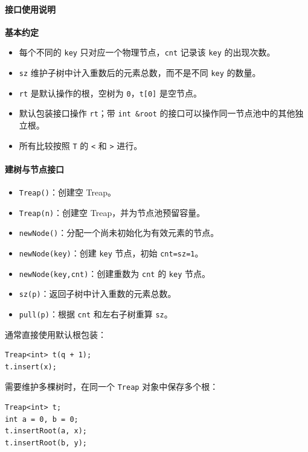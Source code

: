 \paragraph*{接口使用说明}

\textbf{基本约定}

\begin{itemize}
  \item 每个不同的 \texttt{key} 只对应一个物理节点，\texttt{cnt} 记录该 \texttt{key} 的出现次数。
  \item \texttt{sz} 维护子树中计入重数后的元素总数，而不是不同 \texttt{key} 的数量。
  \item \texttt{rt} 是默认操作的根，空树为 \texttt{0}，\texttt{t[0]} 是空节点。
  \item 默认包装接口操作 \texttt{rt}；带 \texttt{int \&root} 的接口可以操作同一节点池中的其他独立根。
  \item 所有比较按照 \texttt{T} 的 \texttt{<} 和 \texttt{>} 进行。
\end{itemize}

\paragraph*{建树与节点接口}

\begin{itemize}
  \item \texttt{Treap()}：创建空 Treap。
  \item \texttt{Treap(n)}：创建空 Treap，并为节点池预留容量。
  \item \texttt{newNode()}：分配一个尚未初始化为有效元素的节点。
  \item \texttt{newNode(key)}：创建 \texttt{key} 节点，初始 \texttt{cnt=sz=1}。
  \item \texttt{newNode(key,cnt)}：创建重数为 \texttt{cnt} 的 \texttt{key} 节点。
  \item \texttt{sz(p)}：返回子树中计入重数的元素总数。
  \item \texttt{pull(p)}：根据 \texttt{cnt} 和左右子树重算 \texttt{sz}。
\end{itemize}

通常直接使用默认根包装：

\begin{verbatim}
Treap<int> t(q + 1);
t.insert(x);
\end{verbatim}

需要维护多棵树时，在同一个 \texttt{Treap} 对象中保存多个根：

\begin{verbatim}
Treap<int> t;
int a = 0, b = 0;
t.insertRoot(a, x);
t.insertRoot(b, y);
\end{verbatim}

